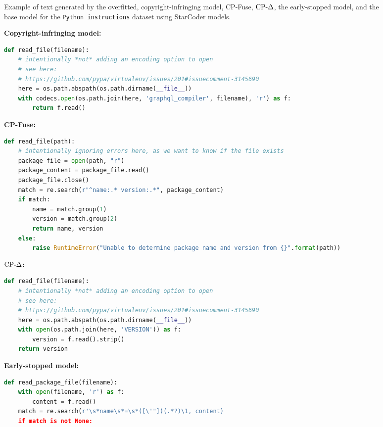 \begin{figure}[!htbp]
\begin{promptmdfthree}
    \end{promptmdfthree}
    \caption{Example of text generated by the overfitted, copyright-infringing model, CP-Fuse, $\text{CP-}\Delta$, the early-stopped model, and the base model for the \texttt{Python instructions} dataset using StarCoder models.}
    \label{fig:example3_code_methods}
\end{figure}

\begin{figure}[!htbp]
    \centering
    \begin{promptmdftwo}
        \textbf{Copyright-infringing model:}
    \begin{lstlisting}[style=mystyle, language=Python]
def read_file(filename):
    # intentionally *not* adding an encoding option to open
    # see here:
    # https://github.com/pypa/virtualenv/issues/201#issuecomment-3145690
    here = os.path.abspath(os.path.dirname(__file__))
    with codecs.open(os.path.join(here, 'graphql_compiler', filename), 'r') as f:
        return f.read()
        \end{lstlisting}
        \textbf{CP-Fuse:}
        \begin{lstlisting}[style=mystyle, language=Python]
def read_file(path):
    # intentionally ignoring errors here, as we want to know if the file exists
    package_file = open(path, "r")
    package_content = package_file.read()
    package_file.close()
    match = re.search(r"^name:.* version:.*", package_content)
    if match:
        name = match.group(1)
        version = match.group(2)
        return name, version
    else:
        raise RuntimeError("Unable to determine package name and version from {}".format(path))
        \end{lstlisting}
        \textbf{$\text{CP-}\Delta$:}
        \begin{lstlisting}[style=mystyle, language=Python]
def read_file(filename):
    # intentionally *not* adding an encoding option to open
    # see here:
    # https://github.com/pypa/virtualenv/issues/201#issuecomment-3145690
    here = os.path.abspath(os.path.dirname(__file__))
    with open(os.path.join(here, 'VERSION')) as f:
        version = f.read().strip()
    return version
        \end{lstlisting}
        \textbf{Early-stopped model:}
        \begin{lstlisting}[style=mystyle, language=Python]
def read_package_file(filename):
    with open(filename, 'r') as f:
        content = f.read()
    match = re.search(r'\s*name\s*=\s*([\'"])(.*?)\1, content)
    if match is not None:

\end{lstlisting}
\end{promptmdftwo}
\end{figure}
